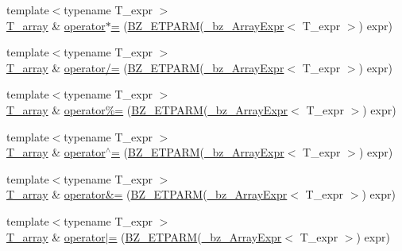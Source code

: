 \begin{DoxyCompactItemize}
\item 
{\footnotesize template$<$typename T\+\_\+expr $>$ }\\\hyperlink{classArray_a6a3d9b6a214107a10df219091801f1e0}{T\+\_\+array} \& \hyperlink{classArray_a0140acdacfcd52fe56984bad7c816bf8}{operator$\ast$=} (\hyperlink{tuning_8h_a92a6f3aa8f4cd5ac9b4239c449892bb7}{B\+Z\+\_\+\+E\+T\+P\+A\+R\+M}(\hyperlink{class__bz__ArrayExpr}{\+\_\+bz\+\_\+\+Array\+Expr}$<$ T\+\_\+expr $>$) expr)
\item 
{\footnotesize template$<$typename T\+\_\+expr $>$ }\\\hyperlink{classArray_a6a3d9b6a214107a10df219091801f1e0}{T\+\_\+array} \& \hyperlink{classArray_ad2def902fe8f066317fbfe27cf3a127f}{operator/=} (\hyperlink{tuning_8h_a92a6f3aa8f4cd5ac9b4239c449892bb7}{B\+Z\+\_\+\+E\+T\+P\+A\+R\+M}(\hyperlink{class__bz__ArrayExpr}{\+\_\+bz\+\_\+\+Array\+Expr}$<$ T\+\_\+expr $>$) expr)
\item 
{\footnotesize template$<$typename T\+\_\+expr $>$ }\\\hyperlink{classArray_a6a3d9b6a214107a10df219091801f1e0}{T\+\_\+array} \& \hyperlink{classArray_a0fc0239bf38ba76bcbdadb48c4865db4}{operator\%=} (\hyperlink{tuning_8h_a92a6f3aa8f4cd5ac9b4239c449892bb7}{B\+Z\+\_\+\+E\+T\+P\+A\+R\+M}(\hyperlink{class__bz__ArrayExpr}{\+\_\+bz\+\_\+\+Array\+Expr}$<$ T\+\_\+expr $>$) expr)
\item 
{\footnotesize template$<$typename T\+\_\+expr $>$ }\\\hyperlink{classArray_a6a3d9b6a214107a10df219091801f1e0}{T\+\_\+array} \& \hyperlink{classArray_aec2987a6e27e7f216b71d497c24926e4}{operator$^\wedge$=} (\hyperlink{tuning_8h_a92a6f3aa8f4cd5ac9b4239c449892bb7}{B\+Z\+\_\+\+E\+T\+P\+A\+R\+M}(\hyperlink{class__bz__ArrayExpr}{\+\_\+bz\+\_\+\+Array\+Expr}$<$ T\+\_\+expr $>$) expr)
\item 
{\footnotesize template$<$typename T\+\_\+expr $>$ }\\\hyperlink{classArray_a6a3d9b6a214107a10df219091801f1e0}{T\+\_\+array} \& \hyperlink{classArray_a40fe7cb88a873c25cb17663856fd851f}{operator\&=} (\hyperlink{tuning_8h_a92a6f3aa8f4cd5ac9b4239c449892bb7}{B\+Z\+\_\+\+E\+T\+P\+A\+R\+M}(\hyperlink{class__bz__ArrayExpr}{\+\_\+bz\+\_\+\+Array\+Expr}$<$ T\+\_\+expr $>$) expr)
\item 
{\footnotesize template$<$typename T\+\_\+expr $>$ }\\\hyperlink{classArray_a6a3d9b6a214107a10df219091801f1e0}{T\+\_\+array} \& \hyperlink{classArray_a211726a9daa508ababe818ee11b2bea3}{operator$\vert$=} (\hyperlink{tuning_8h_a92a6f3aa8f4cd5ac9b4239c449892bb7}{B\+Z\+\_\+\+E\+T\+P\+A\+R\+M}(\hyperlink{class__bz__ArrayExpr}{\+\_\+bz\+\_\+\+Array\+Expr}$<$ T\+\_\+expr $>$) expr)

\end{DoxyCompactItemize}

